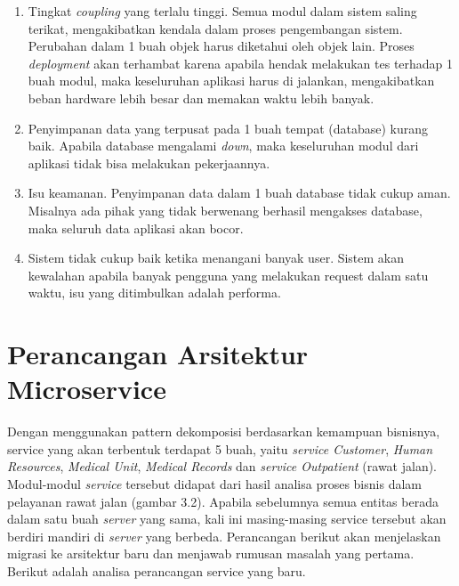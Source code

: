 \begin{enumerate}[leftmargin=*]
	\item Tingkat \textit{coupling} yang terlalu tinggi. Semua modul dalam sistem saling terikat, mengakibatkan kendala dalam proses pengembangan sistem. Perubahan dalam 1 buah objek harus diketahui oleh objek lain. Proses \textit{deployment} akan terhambat karena apabila hendak melakukan tes terhadap 1 buah modul, maka keseluruhan aplikasi harus di jalankan, mengakibatkan beban hardware lebih besar dan memakan waktu lebih banyak.
	\item Penyimpanan data yang terpusat pada 1 buah tempat (database) kurang baik. Apabila database mengalami \textit{down}, maka keseluruhan modul dari aplikasi tidak bisa melakukan pekerjaannya.
	\item Isu keamanan. Penyimpanan data dalam 1 buah database tidak cukup aman. Misalnya ada pihak yang tidak berwenang berhasil mengakses database, maka seluruh data aplikasi akan bocor.
	\item Sistem tidak cukup baik ketika menangani banyak user. Sistem akan kewalahan apabila banyak pengguna yang melakukan request dalam satu waktu, isu yang ditimbulkan adalah performa.
\end{enumerate}

\section{Perancangan Arsitektur Microservice}
Dengan menggunakan pattern dekomposisi berdasarkan kemampuan bisnisnya, service yang akan terbentuk terdapat 5 buah, yaitu \textit{service Customer}, \textit{Human Resources}, \textit{Medical Unit}, \textit{Medical Records} dan \textit{service Outpatient} (rawat jalan). Modul-modul \textit{service} tersebut didapat dari hasil analisa proses bisnis dalam pelayanan rawat jalan (gambar 3.2). Apabila sebelumnya semua entitas berada dalam satu buah \textit{server} yang sama, kali ini masing-masing service tersebut akan berdiri mandiri di \textit{server} yang berbeda. Perancangan berikut akan menjelaskan migrasi ke arsitektur baru dan menjawab rumusan masalah yang pertama. Berikut adalah analisa perancangan service yang baru.

